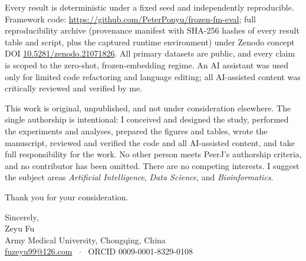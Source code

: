 \documentclass[11pt]{article}
\begin{document}
Every result is deterministic under a fixed seed and independently reproducible. Framework code: \url{https://github.com/PeterPonyu/frozen-fm-eval}; full reproducibility archive (provenance manifest with SHA-256 hashes of every result table and script, plus the captured runtime environment) under Zenodo concept DOI \href{https://doi.org/10.5281/zenodo.21071826}{10.5281/zenodo.21071826}. All primary datasets are public, and every claim is scoped to the zero-shot, frozen-embedding regime. An AI assistant was used only for limited code refactoring and language editing; all AI-assisted content was critically reviewed and verified by me.

This work is original, unpublished, and not under consideration elsewhere. The single authorship is intentional: I conceived and designed the study, performed the experiments and analyses, prepared the figures and tables, wrote the manuscript, reviewed and verified the code and all AI-assisted content, and take full responsibility for the work. No other person meets PeerJ's authorship criteria, and no contributor has been omitted. There are no competing interests. I suggest the subject areas \emph{Artificial Intelligence}, \emph{Data Science}, and \emph{Bioinformatics}.

Thank you for your consideration.

Sincerely,\\ Zeyu Fu\\ Army Medical University, Chongqing, China\\ \href{mailto:fuzeyu99@126.com}{fuzeyu99@126.com} \ $\cdot$ \ ORCID 0009-0001-8329-0108
\end{document}
